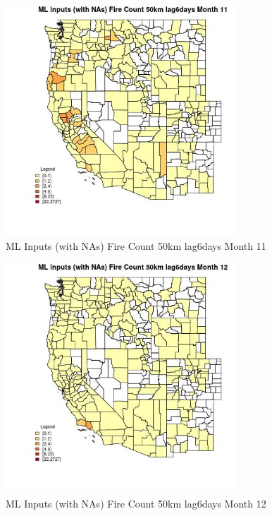 \clearpage 

\begin{figure} 
\centering  
\includegraphics[width=0.77\textwidth]{Code_Outputs/Report_ML_input_PM25_Step4_part_f_de_duplicated_aveswNAs_CountyFire_Count_50km_lag6daysmedianMonth11.jpg} 
\caption{\label{fig:Report_ML_input_PM25_Step4_part_f_de_duplicated_aveswNAsCountyFire_Count_50km_lag6daysmedianMonth11}ML Inputs (with NAs) Fire Count 50km lag6days Month 11} 
\end{figure} 
 

\begin{figure} 
\centering  
\includegraphics[width=0.77\textwidth]{Code_Outputs/Report_ML_input_PM25_Step4_part_f_de_duplicated_aveswNAs_CountyFire_Count_50km_lag6daysmedianMonth12.jpg} 
\caption{\label{fig:Report_ML_input_PM25_Step4_part_f_de_duplicated_aveswNAsCountyFire_Count_50km_lag6daysmedianMonth12}ML Inputs (with NAs) Fire Count 50km lag6days Month 12} 
\end{figure} 
 


